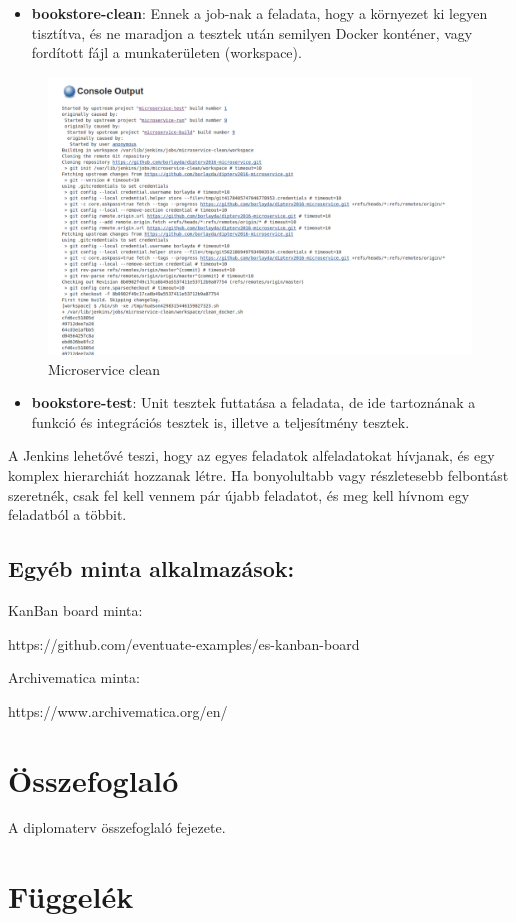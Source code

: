 \documentclass[11pt,magyar,a4paper,oneside,]{report}
\let\Oldincludegraphics\includegraphics
\renewcommand{\includegraphics}[1]{
\begin{adjustbox}{max size={\textwidth}{\textheight}}
    \Oldincludegraphics[scale=0.6]{#1}%
\end{adjustbox}
}
\begin{document}
\begin{itemize}
\itemsep1pt\parskip0pt
\item
  \textbf{bookstore-clean}: Ennek a job-nak a feladata, hogy a környezet
  ki legyen tisztítva, és ne maradjon a tesztek után semilyen Docker
  konténer, vagy fordított fájl a munkaterületen (workspace).
\end{itemize}

\begin{figure}[htbp]
\centering
\includegraphics{img/jenkins-clean.png}
\caption{Microservice clean}
\end{figure}

\begin{itemize}
\itemsep1pt\parskip0pt
\item
  \textbf{bookstore-test}: Unit tesztek futtatása a feladata, de ide
  tartoznának a funkció és integrációs tesztek is, illetve a
  teljesítmény tesztek.
\end{itemize}

A Jenkins lehetővé teszi, hogy az egyes feladatok alfeladatokat
hívjanak, és egy komplex hierarchiát hozzanak létre. Ha bonyolultabb
vagy részletesebb felbontást szeretnék, csak fel kell vennem pár újabb
feladatot, és meg kell hívnom egy feladatból a többit.

\section{Egyéb minta
alkalmazások:}\label{egyuxe9b-minta-alkalmazuxe1sok}

KanBan board minta:

https://github.com/eventuate-examples/es-kanban-board

Archivematica minta:

https://www.archivematica.org/en/

\chapter{Összefoglaló}\label{uxf6sszefoglaluxf3}

A diplomaterv összefoglaló fejezete.

\listoftables
\listoffigures




\appendix

\chapter{Függelék}\label{fuxfcggeluxe9k}
\end{document}
